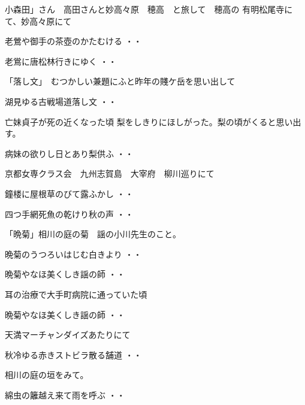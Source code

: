 \documentclass[b5paper]{tbook}
\begin{document}
\vspace{0.6cm}
小森田」さん　高田さんと妙高々原　穂高　と旅して　穂高の
有明松尾寺にて、妙高々原にて
\begin{shiika}老鶯や御手の茶壺のかたむける
\hfill{・・}\end{shiika}
\begin{shiika}老鴬に唐松林行きにゆく
\hfill{・・}\end{shiika}
「落し文」　むつかしい兼題にふと昨年の賤ケ岳を思い出して
\begin{shiika}湖見ゆる古戦場道落し文
\hfill{・・}\end{shiika}
\vspace{0.6cm}
亡妹貞子が死の近くなった頃
梨をしきりにほしがった。梨の頃がくると思い出す。
\begin{shiika}病妹の欲りし日とあり梨供ふ
\hfill{・・}\end{shiika}
\vspace{0.6cm}
京都女専クラス会　九州志賀島　大宰府　柳川巡りにて
\begin{shiika}鐘楼に屋根草のびて露ふかし
\hfill{・・}\end{shiika}
\begin{shiika}四つ手網死魚の乾けり秋の声
\hfill{・・}\end{shiika}
\vspace{0.6cm}
「晩菊」相川の庭の菊　謡の小川先生のこと。
\begin{shiika}晩菊のうつろいはじむ白きより
\hfill{・・}\end{shiika}
\begin{shiika}晩菊やなほ美くしき謡の師
\hfill{・・}\end{shiika}
\vspace{0.6cm}
耳の治療で大手町病院に通っていた頃
\begin{shiika}晩菊やなほ美くしき謡の師
\hfill{・・}\end{shiika}
\vspace{0.6cm}
天満マーチャンダイズあたりにて
\begin{shiika}秋冷ゆる赤きストビラ散る舗道
\hfill{・・}\end{shiika}
\vspace{0.6cm}
相川の庭の垣をみて。
\begin{shiika}綿虫の籬越え来て雨を呼ぶ
\hfill{・・}\end{shiika}
\vspace{0.6cm}
\end{document}
